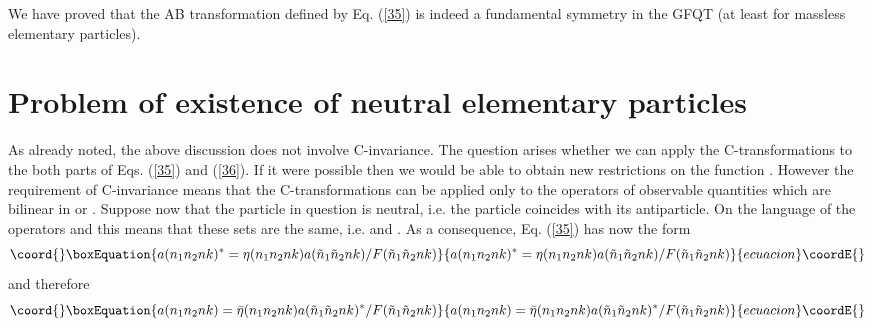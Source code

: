 \documentclass[a4paper,12pt]{article}%
\begin{document}
We have proved that the AB transformation defined by Eq. 
(\ref{35}) is indeed a fundamental symmetry in the GFQT
(at least for massless elementary particles).  

\section{Problem of existence of neutral elementary particles}
\label{S6}

As already noted, the above
discussion does not involve C-invariance. 
The question arises whether we can apply the 
C-transformations to the both parts of Eqs. (\ref{35}) 
and (\ref{36}). 
If it were possible then we would be able to obtain new
restrictions on the function \coordHE{}. However the
requirement of C-invariance means that the C-transformations
can be applied only to the operators of observable
quantities which are bilinear in \coordHE{} or \coordHE{}.
Suppose now that the particle in question is neutral, i.e.
the particle coincides with its antiparticle. On the language
of the operators \coordHE{} and \coordHE{} this means that these
sets are the same, i.e. \coordHE{} and
\coordHE{}. As a consequence, Eq. 
(\ref{35}) has now the form  
\begin{equation}\coord{}\boxEquation{
a(n_1n_2nk)^*=\eta(n_1n_2nk) a({\tilde n}_1{\tilde n}_2nk)/
F({\tilde n}_1{\tilde n}_2nk) 
\label{71}
}{
a(n_1n_2nk)^*=\eta(n_1n_2nk) a({\tilde n}_1{\tilde n}_2nk)/
F({\tilde n}_1{\tilde n}_2nk) 
}{ecuacion}\coordE{}\end{equation}
and therefore 
\begin{equation}\coord{}\boxEquation{
a(n_1n_2nk)={\bar \eta}(n_1n_2nk) a({\tilde n}_1{\tilde n}_2nk)^*/
F({\tilde n}_1{\tilde n}_2nk) 
\label{72}
}{
a(n_1n_2nk)={\bar \eta}(n_1n_2nk) a({\tilde n}_1{\tilde n}_2nk)^*/
F({\tilde n}_1{\tilde n}_2nk) 
}{ecuacion}\coordE{}\end{equation}
\end{document}
